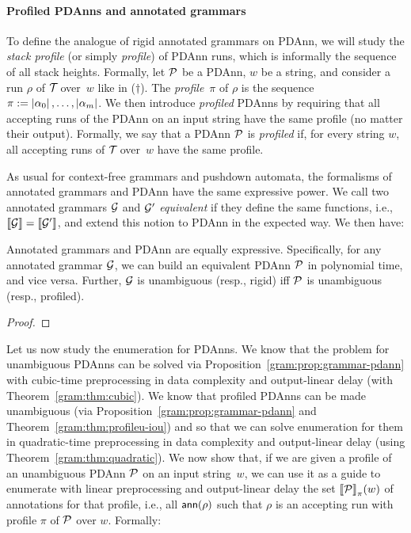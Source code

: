 %
%


\paragraph{Profiled PDAnns and annotated grammars} To define the analogue
of rigid annotated grammars on PDAnn, we will study the
\emph{stack profile} (or simply \emph{profile}) of PDAnn runs, which is
informally the sequence of all stack heights.
Formally, let $\mathcal{P}$ be a PDAnn, $w$ be a string, and consider a run $\rho$ of $\mathcal{T}\!$
over~$w$ like in ($\dagger$).
The \emph{profile}~$\pi$ of $\rho$ is the sequence $\pi:= \left|\alpha_0\right|, \ldots,
\left|\alpha_m\right|$.
We then introduce \emph{profiled} PDAnns by requiring that all
accepting runs of the PDAnn on an input string have the same profile (no matter
their output). Formally, we say that a PDAnn $\mathcal{P}$ is \emph{profiled} if, for every string $w$, all accepting runs of $\mathcal{T}\!$ over~$w$ have the same profile.

As usual for context-free grammars and pushdown automata, the formalisms of annotated grammars and PDAnn have the same expressive power.
We call two annotated grammars
$\mathcal{G}$ and $\mathcal{G}'$ \emph{equivalent} if they define the same functions, i.e.,
${\llbracket{\mathcal{G}}\rrbracket} = {\llbracket{\mathcal{G}'}\rrbracket}$, and extend this notion to PDAnn in the expected way.
We then have:
%
\begin{proposition}\label{gram:prop:grammar-pdann}
	Annotated grammars and PDAnn are equally expressive. Specifically, for any annotated grammar $\mathcal{G}$, we can build an equivalent PDAnn $\mathcal{P}$ in polynomial time, and vice versa.
	Further, $\mathcal{G}$ is unambiguous (resp., rigid) iff $\mathcal{P}$ is unambiguous (resp., profiled).
\end{proposition}
\begin{proof}
  
\end{proof}

%
%
Let us now study the enumeration for PDAnns. We know that the problem
for unambiguous PDAnns can be solved via Proposition~\ref{gram:prop:grammar-pdann}
with cubic-time preprocessing in data complexity and output-linear delay (with
Theorem~\ref{gram:thm:cubic}). We know that
profiled PDAnns can be made unambiguous (via Proposition~\ref{gram:prop:grammar-pdann} and Theorem~\ref{gram:thm:profileu-iou}) and so that
%
we can solve enumeration for them in
quadratic-time preprocessing in data complexity and output-linear delay (using
Theorem~\ref{gram:thm:quadratic}).
We now show that, if we are given a profile of an 
%
%
unambiguous PDAnn $\mathcal{P}$ on an input string~$w$, we can use it as a guide to enumerate with linear
preprocessing and output-linear delay the set ${\llbracket{\mathcal{P}}\rrbracket}_{\pi}(w)$ of
annotations for that profile, i.e., all $\textsf{ann}(\rho)$ such that $\rho$ is an
accepting run with profile $\pi$ of $\mathcal{P}$ over $w$. Formally:

